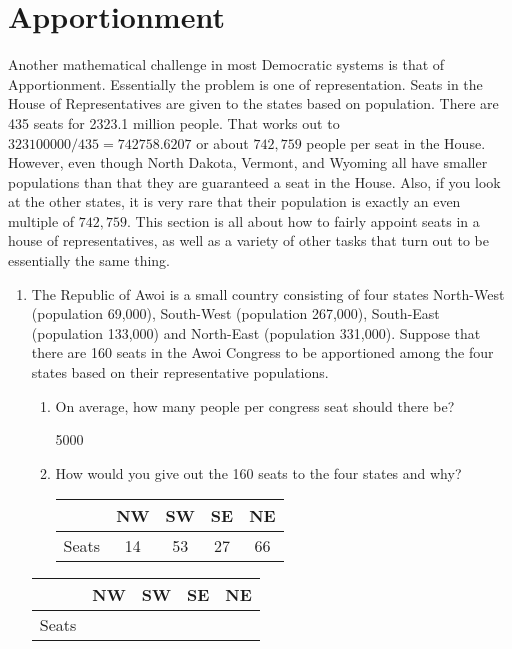 \section{Apportionment} 
Another mathematical challenge in most Democratic systems is that of Apportionment.  Essentially the problem is one of representation.  Seats in the House of Representatives are given to the states based on population.  There are 435 seats for 2323.1 million people.  That works out to $323100000/435 = 742758.6207$ or about $742,759$ people per seat in the House.  However, even though North Dakota, Vermont, and Wyoming all have smaller populations than that they are guaranteed a seat in the House.  Also, if you look at the other states, it is very rare that their population is exactly an even multiple of $742,759$.  This section is all about how to fairly appoint seats in a house of representatives, as well as a variety of other tasks that turn out to be essentially the same thing.

\begin{enumerate}
		\item The Republic of Awoi is a small country consisting of four states North-West (population 69,000), South-West 	(population 267,000), South-East (population 133,000) and North-East (population 331,000).  Suppose that there are 160 seats in the Awoi Congress to be apportioned among the four states based on their representative populations.
		\begin{enumerate}
			\item On average, how many people per congress seat should there be?\ifsolns \par 5000 \else
\fi
	

			\item How would you give out the 160 seats to the four states and why?
			\large
			
			\ifsolns
			\begin{tabular}{c|c|c|c|c} \hline
				& NW & SW & SE & NE \\\hline
				Seats &14&53&27&66 \\\hline
			\end{tabular}
	\end{enumerate}\vfill
	\else
			\begin{tabular}{c|c|c|c|c} \hline
				& NW & SW & SE & NE \\\hline
				Seats &&&& \\\hline
			\end{tabular}
	\end{enumerate} 
	\fi
\normalsize
\clearpage
	
